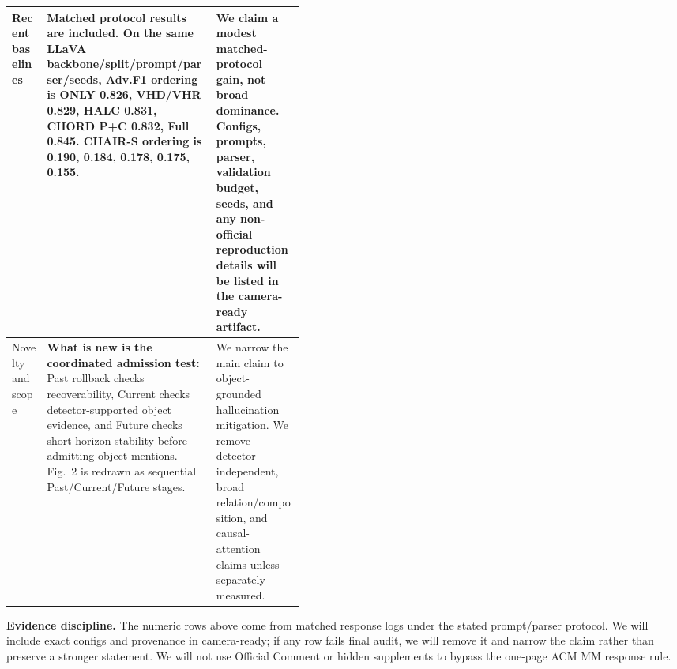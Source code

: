 \documentclass{article}
\begin{document}
\begin{tabularx}{\linewidth}{@{}L{0.125\linewidth}Y L{0.305\linewidth}@{}}
\midrule
Recent baselines & \textbf{Matched protocol results are included.} On the same LLaVA backbone/split/prompt/parser/seeds, Adv.F1 ordering is ONLY 0.826, VHD/VHR 0.829, HALC 0.831, CHORD P+C 0.832, Full 0.845. CHAIR-S ordering is 0.190, 0.184, 0.178, 0.175, 0.155. & We claim a modest matched-protocol gain, not broad dominance. Configs, prompts, parser, validation budget, seeds, and any non-official reproduction details will be listed in the camera-ready artifact. \\
\midrule
Novelty and scope & \textbf{What is new is the coordinated admission test:} Past rollback checks recoverability, Current checks detector-supported object evidence, and Future checks short-horizon stability before admitting object mentions. Fig.~2 is redrawn as sequential Past/Current/Future stages. & We narrow the main claim to object-grounded hallucination mitigation. We remove detector-independent, broad relation/composition, and causal-attention claims unless separately measured. \\
\bottomrule
\end{tabularx}

\vspace{2pt}
\textbf{Evidence discipline.} The numeric rows above come from matched response logs under the stated prompt/parser protocol. We will include exact configs and provenance in camera-ready; if any row fails final audit, we will remove it and narrow the claim rather than preserve a stronger statement. We will not use Official Comment or hidden supplements to bypass the one-page ACM MM response rule.
\end{document}

